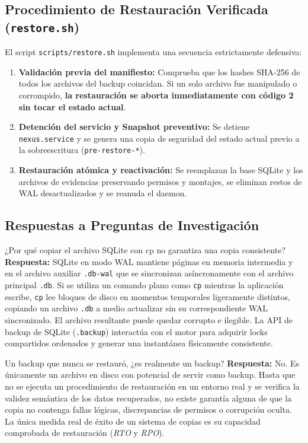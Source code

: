 \documentclass[10pt,a4paper]{article}
\begin{document}
\subsection{Procedimiento de Restauración Verificada (\texttt{restore.sh})}

El script \texttt{scripts/restore.sh} implementa una secuencia estrictamente defensiva:
\begin{enumerate}[leftmargin=*]
    \item \textbf{Validación previa del manifiesto:} Comprueba que los hashes SHA-256 de todos los archivos del backup coincidan. Si un solo archivo fue manipulado o corrompido, \textbf{la restauración se aborta inmediatamente con código 2 sin tocar el estado actual}.
    \item \textbf{Detención del servicio y Snapshot preventivo:} Se detiene \texttt{nexus.service} y se genera una copia de seguridad del estado actual previo a la sobreescritura (\texttt{pre-restore-*}).
    \item \textbf{Restauración atómica y reactivación:} Se reemplazan la base SQLite y los archivos de evidencias preservando permisos y montajes, se eliminan restos de WAL desactualizados y se reanuda el daemon.
\end{enumerate}

\subsection{Respuestas a Preguntas de Investigación}

\begin{pregunta}{¿Por qué copiar el archivo SQLite con cp no garantiza una copia consistente?}
    \textbf{Respuesta:} SQLite en modo WAL mantiene páginas en memoria intermedia y en el archivo auxiliar \texttt{.db-wal} que se sincronizan asíncronamente con el archivo principal \texttt{.db}. Si se utiliza un comando plano como \texttt{cp} mientras la aplicación escribe, \texttt{cp} lee bloques de disco en momentos temporales ligeramente distintos, copiando un archivo \texttt{.db} a medio actualizar sin su correspondiente WAL sincronizado. El archivo resultante puede quedar corrupto e ilegible. La API de backup de SQLite (\texttt{.backup}) interactúa con el motor para adquirir locks compartidos ordenados y generar una instantánea físicamente consistente.
\end{pregunta}

\begin{pregunta}{Un backup que nunca se restauró, ¿es realmente un backup?}
    \textbf{Respuesta:} No. Es únicamente un archivo en disco con potencial de servir como backup. Hasta que no se ejecuta un procedimiento de restauración en un entorno real y se verifica la validez semántica de los datos recuperados, no existe garantía alguna de que la copia no contenga fallas lógicas, discrepancias de permisos o corrupción oculta. La única medida real de éxito de un sistema de copias es su capacidad comprobada de restauración (\textit{RTO} y \textit{RPO}).
\end{pregunta}
\end{document}
